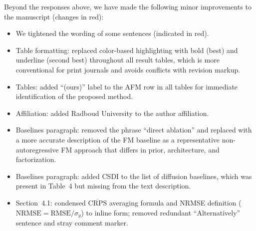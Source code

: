 \documentclass[11pt]{article}
\newcommand{\authorresponse}[1]{%
    #1\par\medskip
}
\begin{document}
\authorresponse{%
Beyond the responses above, we have made the following minor improvements to the manuscript (changes in red):
\begin{itemize}[nosep]
\item We tightened the wording of some sentences (indicated in red).
  \item Table formatting: replaced color-based highlighting with bold (best) and underline (second best) throughout all result tables, which is more conventional for print journals and avoids conflicts with revision markup.
  \item Tables: added ``(ours)'' label to the AFM row in all tables for immediate identification of the proposed method.
  \item Affiliation: added Radboud University to the author affiliation.
  \item Baselines paragraph: removed the phrase ``direct ablation'' and replaced with a more accurate description of the FM baseline as a representative non-autoregressive FM approach that differs in prior, architecture, and factorization.
  \item Baselines paragraph: added CSDI to the list of diffusion baselines, which was present in Table~4 but missing from the text description.
  \item Section~4.1: condensed $\overline{\text{CRPS}}$ averaging formula and NRMSE definition ($\text{NRMSE} = \text{RMSE}/\sigma_y$) to inline form; removed redundant ``Alternatively'' sentence and stray comment marker.
\end{itemize}
}



\end{document}
